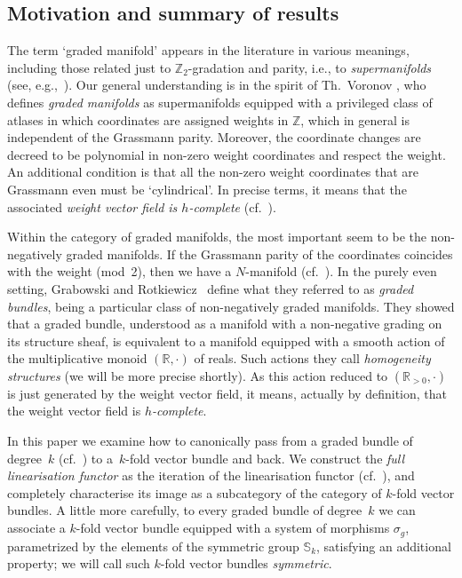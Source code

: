 \documentclass[pdftex]{sigma}
\newcommand{\R}{{\mathbb R}}
\newcommand{\Zet}{{\mathbb Z}}
\newcommand{\Sgroup}{\mathbb{S}}
\numberwithin{equation}{section}
\begin{document}
\subsection{Motivation and summary of results}

The term `graded manifold' appears in the literature in various meanings, including those related just to $\mathbb{Z}_2$-gradation and parity, i.e., to \emph{supermanifolds} (see, e.g.,~\cite{Kostant:1977}). Our general under\-standing is in the spirit of Th.~Voronov \cite{Voronov:2001qf}, who def\/ines \emph{graded manifolds} as supermanifolds equipped with a privileged class of atlases in which coordinates are assigned weights in $\Zet$, which in ge\-neral is independent of the Grassmann parity. Moreover, the coordinate changes are decreed to be polynomial in non-zero weight coordinates and respect the weight. An additional condition is that all the non-zero weight coordinates that are Grassmann even must be `cylindrical'. In precise terms, it means that the associated \emph{weight vector field is $h$-complete} (cf.~\cite{Grabowski2013}).

Within the category of graded manifolds, the most important seem to be the non-negatively graded manifolds. If the Grassmann parity of the coordinates coincides with the weight (mod~2), then we have a $N$-manifold (cf.~\cite{Roytenberg:2002,Severa:2005}). In the purely even setting, Grabowski and Rotkie\-wicz~\cite{JG_MR_higher_vb} def\/ine what they referred to as \emph{graded bundles}, being a particular class of non-negatively graded manifolds. They showed that a graded bundle, understood as a manifold with a non-negative grading on its structure sheaf, is equivalent to a manifold equipped with a smooth action of the multiplicative monoid $(\R,\cdot)$ of reals. Such actions they call \emph{homogeneity structures} (we will be more precise shortly). As this action reduced to $(\R_{>0},\cdot)$ is just generated by the weight vector f\/ield, it means, actually by def\/inition, that the weight vector f\/ield is \emph{$h$-complete}.

In this paper we examine how to canonically pass from a graded bundle of degree~$k$ (cf.~\cite{JG_MR_higher_vb}) to a~$k$-fold vector bundle and back. We construct the \emph{full linearisation functor} as the iteration of the linearisation functor (cf.~\cite{Bruce:2014}), and completely characterise its image as a subcategory of the category of $k$-fold vector bundles. A little more carefully, to every graded bundle of degree~$k$ we can associate a $k$-fold vector bundle equipped with a system of morphisms $\sigma_g$, parametrized by the elements of the symmetric group $\Sgroup_k$, satisfying an additional property; we will call such $k$-fold vector bundles \emph{symmetric}.
\end{document}
